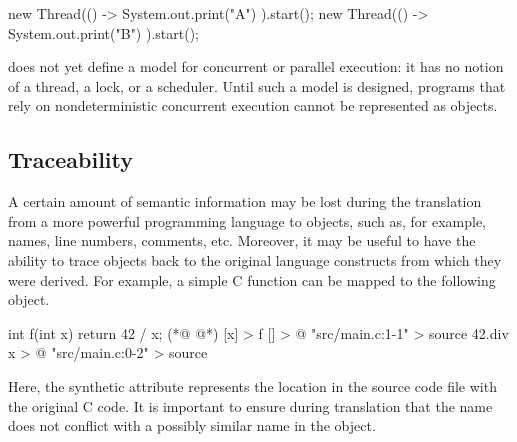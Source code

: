\begin{ffcode}
new Thread(() ->
  System.out.print("A")
).start();
new Thread(() ->
  System.out.print("B")
).start();
\end{ffcode}

\eolang{} does not yet define a model for concurrent or parallel execution:
  it has no notion of a thread, a lock, or a scheduler.
Until such a model is designed, programs that rely on nondeterministic
  concurrent execution cannot be represented as \eolang{} objects.

\subsection{Traceability}

A certain amount of semantic information may be lost during the translation
  from a more powerful programming language to \eolang{} objects, such as,
  for example, names, line numbers, comments, etc.
Moreover, it may be useful to have the ability to trace \eolang{} objects
  back to the original language constructs from which they were derived.
For example, a simple C function can be mapped
  to the following \eolang{} object.

\begin{ffcode}
int f(int x) {
  return 42 / x;
}
(*@ \ffcolumnbreak @*)
[x] > f
  [] > @
    "src/main.c:1-1" > source
    42.div x > @
  "src/main.c:0-2" > source
\end{ffcode}

Here, the synthetic  attribute represents the location
  in the source code file with the original C code.
It is important to ensure during translation that the name 
  does not conflict with a possibly similar name in the object.
